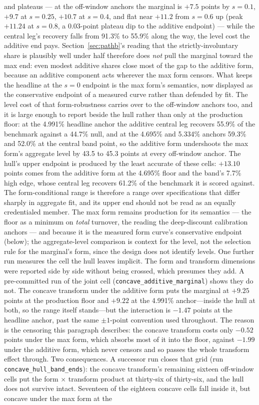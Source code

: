 \documentclass[12pt]{article}
\begin{document}
and plateaus --- at the off-window anchors the marginal is $+7.5$ points by $s = 0.1$, $+9.7$ at $s = 0.25$, $+10.7$ at $s = 0.4$, and flat near $+11.2$ from $s = 0.6$ up (peak $+11.24$ at $s = 0.8$, a 0.03-point plateau dip to the additive endpoint) --- while the central leg's recovery falls from 91.3\% to 55.9\% along the way, the level cost the additive end pays. Section~\ref{sec:pathb}'s reading that the strictly-involuntary share is plausibly well under half therefore does \emph{not} pull the marginal toward the max end: even modest additive shares close most of the gap to the additive form, because an additive component acts wherever the max form censors. What keeps the headline at the $s = 0$ endpoint is the max form's semantics, now displayed as the conservative endpoint of a measured curve rather than defended by fit. The level cost of that form-robustness carries over to the off-window anchors too, and it is large enough to report beside the hull rather than only at the production floor: at the 4.991\% headline anchor the additive central leg recovers 55.9\% of the benchmark against a 44.7\% null, and at the 4.695\% and 5.334\% anchors 59.3\% and 52.0\% at the central band point, so the additive form undershoots the max form's aggregate level by 43.5 to 45.3 points at every off-window anchor. The hull's upper endpoint is produced by the least accurate of these cells: $+13.10$ points comes from the additive form at the 4.695\% floor and the band's 7.7\% high edge, whose central leg recovers 61.2\% of the benchmark it is scored against. The form-conditional range is therefore a range over specifications that differ sharply in aggregate fit, and its upper end should not be read as an equally credentialed member. The max form remains production for its semantics --- the floor as a minimum on \emph{total} turnover, the reading the deep-discount calibration anchors --- and because it is the measured form curve's conservative endpoint (below); the aggregate-level comparison is context for the level, not the selection rule for the marginal's form, since the design does not identify levels. One further run measures the cell the hull leaves implicit. The form and transform dimensions were reported side by side without being crossed, which presumes they add. A pre-committed run of the joint cell (\texttt{concave\_additive\_marginal}) shows they do not. The concave transform under the additive form puts the marginal at $+9.25$ points at the production floor and $+9.22$ at the 4.991\% anchor---inside the hull at both, so the range itself stands---but the interaction is $-1.47$ points at the headline anchor, past the same $\pm 1$-point convention used throughout. The reason is the censoring this paragraph describes: the concave transform costs only $-0.52$ points under the max form, which absorbs most of it into the floor, against $-1.99$ under the additive form, which never censors and so passes the whole transform effect through. Two consequences. A successor run closes that grid (run \texttt{concave\_hull\_band\_ends}): the concave transform's remaining sixteen off-window cells put the form $\times$ transform product at thirty-six of thirty-six, and the hull does not survive intact. Seventeen of the eighteen concave cells fall inside it, but concave under the max form at the 
\end{document}
